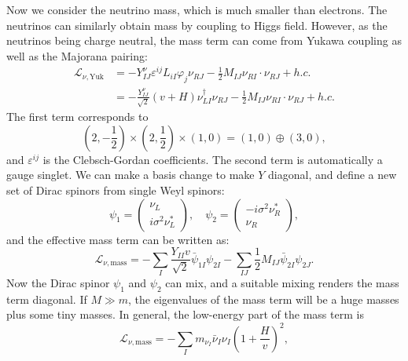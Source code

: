 Now we consider the neutrino mass, which is much smaller than electrons.
The neutrinos can similarly obtain mass by coupling to Higgs field.
However, as the neutrinos being charge neutral, the mass term can come from Yukawa coupling as well as the Majorana pairing:
\begin{equation}
\begin{aligned}
	\mathcal L_{\nu,\mathrm{Yuk}} 
	&= - Y^\nu_{IJ} \varepsilon^{ij} L_{iI} \varphi_j \nu_{RJ} - \frac{1}{2} M_{IJ} \nu_{RI} \cdot \nu_{RJ} + h.c. \\
	&= -\frac{Y^\nu_{IJ}}{\sqrt 2}(v+H) \nu_{LI}^\dagger \nu_{RJ} - \frac{1}{2}M_{IJ}\nu_{RI}\cdot \nu_{RJ} + h.c.
\end{aligned}
\end{equation}
The first term corresponds to
\begin{equation}
	\left(2, -\frac{1}{2}\right) \times \left(2, \frac{1}{2}\right) \times \left(1, 0\right) = \left(1,0\right) \oplus(3,0),
\end{equation}
and $\varepsilon^{ij}$ is the Clebsch-Gordan coefficients.
The second term is automatically a gauge singlet.
We can make a basis change to make $Y$ diagonal, and define a new set of Dirac spinors from single Weyl spinors:
\begin{equation}
	\psi_1 = \begin{pmatrix}
		\nu_L \\ i\sigma^2 \nu_L^*
	\end{pmatrix}, \quad
	\psi_2 = \begin{pmatrix}
		-i\sigma^2 \nu_R^* \\ \nu_R
	\end{pmatrix},
\end{equation}
and the effective mass term can be written as:
\begin{equation}
	\mathcal L_{\nu,\mathrm{mass}} 
	= -\sum_I \frac{Y_{II} v}{\sqrt 2}\bar\psi_{1I} \psi_{2I} - \sum_{IJ}\frac{1}{2} M_{IJ} \bar\psi_{2I} \psi_{2J}.
\end{equation}
Now the Dirac spinor $\psi_1$ and $\psi_2$ can mix, and a suitable mixing renders the mass term diagonal.
If $M \gg m$, the eigenvalues of the mass term will be a huge masses plus some tiny masses.
In general, the low-energy part of the mass term is
\begin{equation}
	\mathcal L_{\nu,\mathrm{mass}} = -\sum_I m_{\nu_I}\bar\nu_I \nu_I \left(1+\frac{H}{v}\right)^2,
\end{equation}

